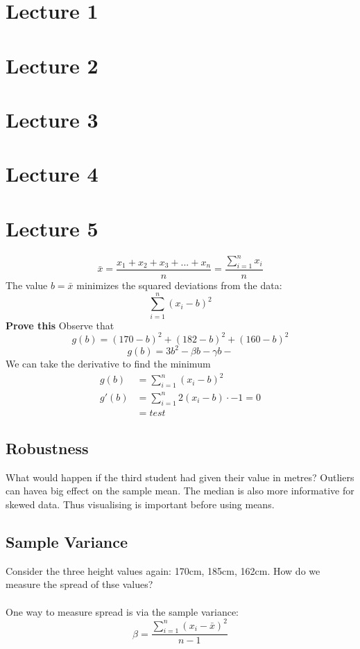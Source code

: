 \documentclass[a6paper]{article}
\theoremstyle{definition}
\theoremstyle{plain}
\theoremstyle{remark}
\begin{document}
\maketitle
\noindent
\section{Lecture 1}
\section{Lecture 2}
\section{Lecture 3}
\section{Lecture 4}
\section{Lecture 5}
$$ \bar{x} = \frac{x_1 + x_2 + x_3 + ... + x_n}{n} = \frac{\displaystyle \sum_{i=1}^n x_i}{n} $$
The value $ b = \bar{x} $ minimizes the squared deviations from the data:
$$ \sum_{i=1}^n (x_i - b)^2 $$
\textbf{Prove this}
Observe that 
$$ g(b) = (170 - b)^2 + (182 - b)^2 + (160 - b)^2 $$
$$ g(b) = 3b^2 - \beta b - \gamma b -  $$
We can take the derivative to find the minimum
\begin{align*}
	g(b) &= \sum_{i=1}^n (x_i - b)^2\\
	g'(b) &= \sum_{i=1}^n 2(x_i -b) \cdot -1 = 0\\
	      &= test
\end{align*}

\subsection{Robustness}
What would happen if the third student had given their value in metres? Outliers can havea  big effect on the sample mean. The median is also more informative for skewed data. Thus visualising is important before using means.

\subsection{Sample Variance}
Consider the three height values again: 170cm, 185cm, 162cm. How do we measure the spread of thse values?\\\\
One way to measure spread is via the sample variance:
$$ \beta = \frac{\sum_{i=1}^n (x_i - \bar{x})^2}{n-1} $$
\end{document}
